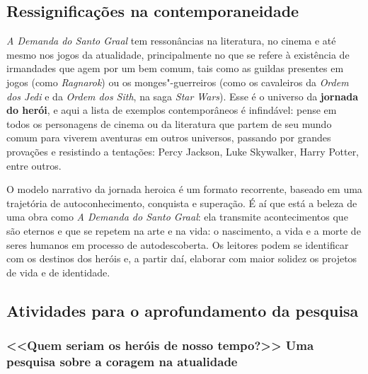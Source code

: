 \documentclass[11pt]{extarticle}
\begin{document}
\subsection{Ressignificações na contemporaneidade}

\emph{A Demanda do Santo Graal} tem ressonâncias na literatura, no
cinema e até mesmo nos jogos da atualidade, principalmente no que se
refere à existência de irmandades que agem por um bem comum, tais como
as guildas presentes em jogos (como \emph{Ragnarok}) ou os
monges"-guerreiros (como os cavaleiros da \emph{Ordem dos Jedi} e da
\emph{Ordem dos Sith}, na saga \emph{Star Wars}). Esse é o universo da
\textbf{jornada do herói}, e aqui a lista de exemplos contemporâneos é
infindável: pense em todos os personagens de cinema ou da literatura que
partem de seu mundo comum para viverem aventuras em outros universos,
passando por grandes provações e resistindo a tentações: Percy Jackson,
Luke Skywalker, Harry Potter, entre outros.

O modelo narrativo da jornada heroica é um formato recorrente, baseado
em uma trajetória de autoconhecimento, conquista e superação. É aí que
está a beleza de uma obra como \emph{A Demanda do Santo Graal}: ela
transmite acontecimentos que são eternos e que se repetem na arte e na
vida: o nascimento, a vida e a morte de seres humanos em processo de
autodescoberta. Os leitores podem se identificar com os destinos dos
heróis e, a partir daí, elaborar com maior solidez os projetos de vida e
de identidade.

\subsection{Atividades para o aprofundamento da pesquisa}




\subsubsection{<<Quem seriam os heróis de nosso tempo?>> Uma pesquisa sobre a coragem na atualidade}
\end{document}
